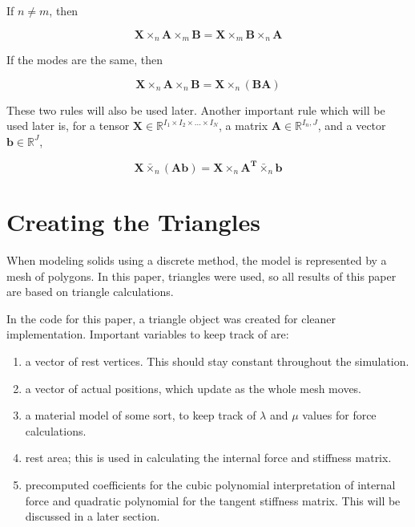 \documentclass[twocolumn,10pt]{asme2ej}
\begin{document}
\bigskip
If $n \neq m$, then

\begin{equation}
\bm{X} \times_n \bm{A} \times_m  \bm{B} = \bm{X} \times_m \bm{B} \times_n \bm{A}
\label{eq_matrixModeCommute}
\end{equation}

If the modes are the same, then

\begin{equation}
\bm{X} \times_n \bm{A} \times_n  \bm{B} = \bm{X} \times_n (\bm{BA})
\label{eq_matrixModeAssociate}
\end{equation}

These two rules will also be used later. Another important rule which will be used later is, for  a tensor $\bm{X} \in \mathbb{R}^{I_1 \times I_2 \times ... \times I_N}$, a matrix $\bm{A} \in \mathbb{R}^{I_n, J}$, and a vector $\bm{b} \in \mathbb{R}^{J}$,

\begin{equation}
\bm{X} \bar{\times}_n (\bm{Ab}) = \bm{X} \times_n \bm{A^T} \bar{\times}_n \bm{b}
\label{eq_productDecompose}
\end{equation}

\section{Creating the Triangles}

When modeling solids using a discrete method, the model is represented by a mesh of polygons. In this paper, triangles were
used, so all results of this paper are based on triangle calculations.

In the code for this paper, a triangle object was created for cleaner implementation. Important variables to keep track of are:
\begin{enumerate}
  \item a vector of rest vertices. This should stay constant throughout the simulation.
  \item a vector of actual positions, which update as the whole mesh moves.
  \item a material model of some sort, to keep track of $\lambda$ and $\mu$ values for force calculations.
  \item rest area; this is used in calculating the internal force and stiffness matrix.
  \item precomputed coefficients for the cubic polynomial interpretation of internal force and quadratic polynomial
  for the tangent stiffness matrix. This will be discussed in a later section.
\end{enumerate}
\end{document}
